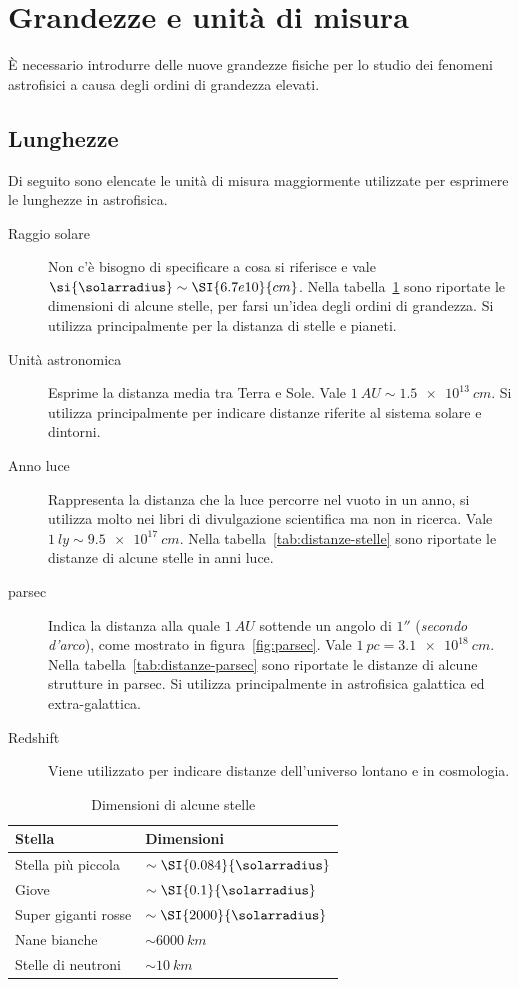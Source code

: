 \section{Grandezze e unità di misura}\label{sec:unità}
È necessario introdurre delle nuove grandezze fisiche per lo studio dei fenomeni astrofisici a causa degli ordini di grandezza elevati.
\subsection{Lunghezze}
Di seguito sono elencate le unità di misura maggiormente utilizzate per esprimere le lunghezze in astrofisica.
\begin{description}
    \item[Raggio solare] Non c'è bisogno di specificare a cosa si riferisce e vale $\si{\solarradius} \sim \SI{6.7e10}{cm}$. Nella tabella~\ref{tab:dimensioni-stelle} sono riportate le dimensioni di alcune stelle, per farsi un'idea degli ordini di grandezza. Si utilizza principalmente per la distanza di stelle e pianeti.
    \item[Unità astronomica] Esprime la distanza media tra Terra e Sole. Vale $\SI{1}{AU} \sim \SI{1.5e13}{cm}$. Si utilizza principalmente per indicare distanze riferite al sistema solare e dintorni.
    \item[Anno luce] Rappresenta la distanza che la luce percorre nel vuoto in un anno, si utilizza molto nei libri di divulgazione scientifica ma non in ricerca. Vale $\SI{1}{ly} \sim \SI{9.5e17}{cm}$. Nella tabella~\ref{tab:distanze-stelle} sono riportate le distanze di alcune stelle in anni luce.
    \item[parsec] Indica la distanza alla quale $\SI{1}{AU}$ sottende un angolo di $\ang{;;1}$ (\emph{secondo d'arco}), come mostrato in figura~\ref{fig:parsec}. Vale $\SI{1}{pc} = \SI{3.1e18}{cm}$. Nella tabella~\ref{tab:distanze-parsec} sono riportate le distanze di alcune strutture in parsec. Si utilizza principalmente in astrofisica galattica ed extra-galattica.
    \item[Redshift] Viene utilizzato per indicare distanze dell'universo lontano e in cosmologia.
\end{description}

\begin{table}
\caption{Dimensioni di alcune stelle}
\label{tab:dimensioni-stelle}
\centering
\begin{tabular}{ll}
\toprule
Stella & Dimensioni \\
\midrule
Stella più piccola          & $\sim \SI{0.084}{\solarradius}$ \\
Giove           & $\sim \SI{0.1}{\solarradius}$    \\
Super giganti rosse             & $\sim \SI{2000}{\solarradius}$  \\
Nane bianche & $\sim \SI{6000}{km}$  \\
Stelle di neutroni & $\sim \SI{10}{km}$  \\
\bottomrule
\end{tabular}
\end{table}

